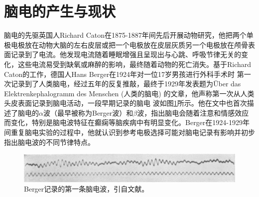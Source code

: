 \thesischapterexordium
\section{脑电的产生与现状}
脑电的先驱英国人Richard Caton在1875-1887年间先后开展动物研究，他把两个单极电极放在动物大脑的左右皮层或把一个电极放在皮层灰质另一个电极放在颅骨表面记录到了电流。他发现电流随着睡眠增强且呈现出与心跳、呼吸节律无关的变化，这些电流易受到缺氧或麻醉的影响，最终随着动物的死亡消失。基于Richard Caton的工作，德国人Hans Berger在1924年对一位17岁男孩进行外科手术时
第一次记录到了人类脑电，经过五年的反复推敲，最终于1929年发表题为Über das Elektrenkephalogramm des Menschen (人类的脑电) 的文章，他声称第一次从人类头皮表面记录到脑电活动，一段早期记录的脑电
波如图\ref{1:wave}所示。他在文中也首次描述了脑电的$\alpha$波（最早被称为Berger波）和$\beta$波，指出脑电会随着注意和情感效应而变化，特别是脑电波特征在癫痫等脑疾病中有明显变化。Berger在1924-1929年间重复脑电实验的过程中，他就认识到参考电极选择可能对脑电记录有影响并初步指出脑电波的不同节律特点。
\begin{figure}[!h]
	\includegraphics[width=13cm]{pic/xulun/EEGwave.png}
	\caption{Berger记录的第一条脑电波，引自文献。}
	\label{1:wave}
\end{figure}

